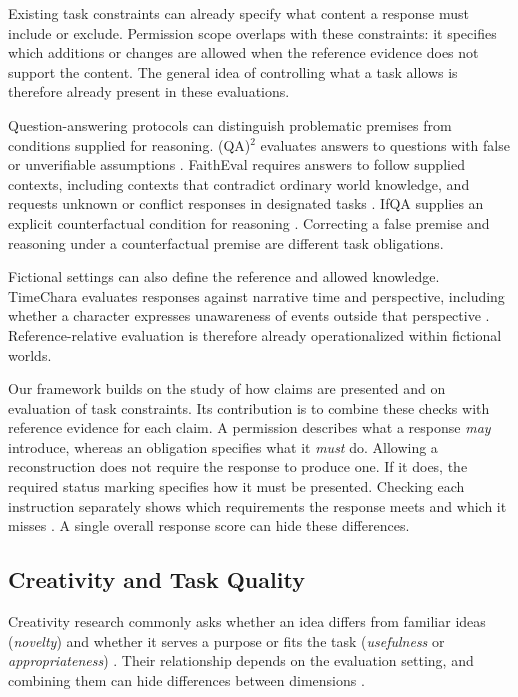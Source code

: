 \documentclass{clv2025}
\begin{document}
Existing task constraints can already specify what content a response
must include or exclude. Permission scope overlaps with these constraints:
it specifies which additions or changes are allowed when the reference
evidence does not support the content. The general idea of controlling
what a task allows is therefore already present in these evaluations.

Question-answering protocols can distinguish problematic premises from
conditions supplied for reasoning. (QA)$^2$ evaluates answers to questions
with false or unverifiable assumptions \citep{kim_qa2_2023}.
FaithEval requires answers to follow supplied contexts, including contexts
that contradict ordinary world knowledge, and requests unknown or conflict
responses in designated tasks \citep{ming_faitheval_2025}.
IfQA supplies an explicit counterfactual condition for reasoning
\citep{yu_ifqa_2023}. Correcting a false premise and reasoning under a
counterfactual premise are different task obligations.

Fictional settings can also define the reference and allowed knowledge.
TimeChara evaluates responses against narrative time and perspective,
including whether a character expresses unawareness of events outside
that perspective \citep{ahn_timechara_2024}. Reference-relative evaluation
is therefore already operationalized within fictional worlds.

Our framework builds on the study of how claims are presented and on
evaluation of task constraints. Its contribution is to combine these
checks with reference evidence for each claim. 
A permission describes what a response \emph{may} introduce, whereas an
obligation specifies what it \emph{must} do. Allowing a reconstruction does
not require the response to produce one. If it does, the required status
marking specifies how it must be presented. Checking each instruction
separately shows which requirements the response meets and which it
misses \citep{lee_mcjudgebench_2026}. A single overall response score can
hide these differences.

\subsection{Creativity and Task Quality}\label{subsec:creativity}

Creativity research commonly asks whether an idea differs from familiar
ideas (\emph{novelty}) and whether it serves a purpose or fits the task
(\emph{usefulness} or \emph{appropriateness})
\citep{runco_standard_2012,diedrich_are_2015}.
Their relationship depends on the evaluation setting, and combining them can
hide differences between dimensions \citep{pichot_reflective_2024}.
\end{document}
